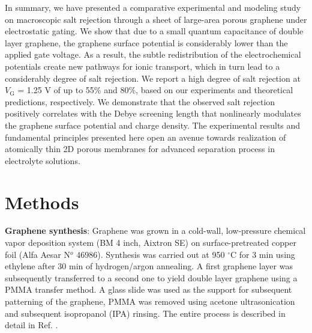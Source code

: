 \documentclass[journal=langd5,email=true, hyperref=true, keywords=false]{achemso}
\begin{document}
In summary, we have
presented a comparative experimental and modeling study on macroscopic
salt rejection through a sheet of large-area porous graphene under
electrostatic gating. We show that due to a small quantum capacitance
of double layer graphene, the graphene surface potential is
considerably lower than the applied gate voltage. As a result, the
subtle redistribution of the electrochemical potentials create new
pathways for ionic transport, which in turn lead to a considerably
degree of salt rejection. We report a high degree of salt rejection at
$V_{\mathrm{G}}$ = 1.25 V of up to 55\% and 80\%, based on our
experiments and theoretical predictions, respectively. We demonstrate
that the observed salt rejection positively correlates with the Debye
screening length that nonlinearly modulates the graphene surface
potential and charge density. The experimental results and fundamental
principles presented here open an avenue towards realization of
atomically thin 2D porous membranes for advanced separation process in
electrolyte solutions.

\section{Methods}
\label{sec:methods}

\textbf{Graphene synthesis}: Graphene was grown in a cold-wall,
low-pressure chemical vapor deposition system (BM 4 inch, Aixtron SE)
on surface-pretreated copper foil (Alfa Aesar N$^{o}$ 46986). Synthesis was
carried out at 950 $^{\circ}$C for 3 min using ethylene after 30 min of
hydrogen/argon annealing. A first graphene layer was subsequently
transferred to a second one to yield double layer graphene using a
PMMA transfer method. A glass slide was used as the support for
subsequent patterning of the graphene, PMMA was removed using acetone
ultrasonication and subsequent isopropanol (IPA) rinsing. The entire
process is described in detail in Ref. .
\end{document}
